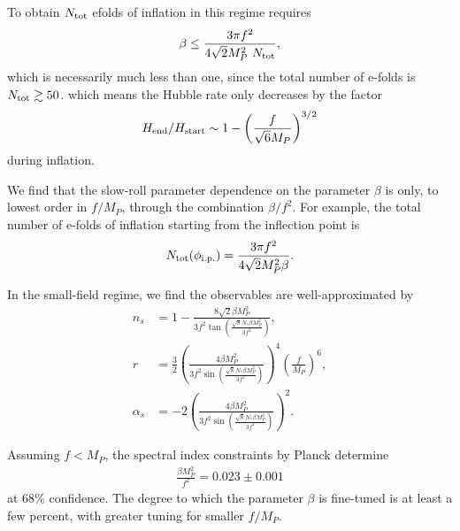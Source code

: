 \documentclass[aps,amsfonts,amsmath,prd,preprint,nofootinbib,superscriptaddress]{revtex4}
\newcommand{\Mp}{{M_{P}}}
\newcommand{\MMp}{{M_P^2}}
\begin{document}
To obtain $N_{\rm tot}$ efolds of inflation in this regime requires
\begin{align}
 \beta \leq \frac{3\pi f^2}{4\sqrt{2}\MMp~N_{\rm tot}}, 
 \end{align}
which is necessarily much less than one, since the total number of e-folds is $N_{\rm tot} \gtrsim 50$. 
which means the Hubble rate only decreases by the factor
\begin{align}
H_{\rm end}/H_{\rm start} \sim 1-\left(\frac{f}{\sqrt{6}\Mp}\right)^{3/2}
\end{align}
during inflation.  







We find that the slow-roll parameter dependence
on the parameter $\beta$ is only, to lowest order in $f/\Mp$, through the combination $\beta/f^2$.  For example, the total number of e-folds of inflation starting from the inflection point is
\begin{align}
N_{\rm tot}(\phi_{\rm i.p.}) = \frac{3 \pi f^2}{4\sqrt{2}\MMp\beta}.
\end{align}

In the small-field regime, we find the observables are well-approximated by
\begin{align}
n_s &= 1- \frac{8\sqrt{2}\beta \MMp}{3f^2\tan(\frac{\sqrt{8}N_\ast\beta\MMp}{3 f^2})},\label{eq:nsSF}\\
r &= \frac{3}{2}\left(\frac{4\beta\MMp}{3f^2\sin(\frac{\sqrt{8}N_\ast\beta\MMp}{3 f^2})}\right)^4 \left(\frac{f}{\Mp}\right)^6 ,\\
\alpha_s &= -2\left(\frac{4\beta \MMp}{3f^2\sin(\frac{\sqrt{8}N_\ast\beta\MMp}{3 f^2})} \right)^2.
\end{align}

Assuming $f < \Mp$, the spectral index constraints by Planck \cite{Akrami:2018odb} determine
\begin{align}
\frac{\beta \MMp}{f^2} = 0.023 \pm 0.001
\end{align}
 at 68\% confidence.  The degree to which the parameter $\beta$ is fine-tuned is at least a few percent, with greater tuning for smaller $f/\Mp$.
\end{document}
